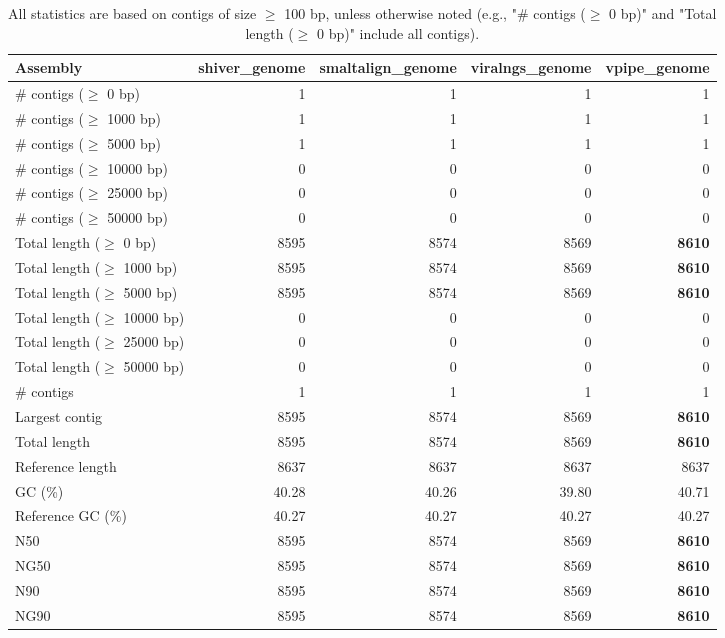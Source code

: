 \documentclass[12pt,a4paper]{article}
\begin{document}
\begin{table}[ht]
\begin{center}
\caption{All statistics are based on contigs of size $\geq$ 100 bp, unless otherwise noted (e.g., "\# contigs ($\geq$ 0 bp)" and "Total length ($\geq$ 0 bp)" include all contigs).}
\begin{tabular}{|l*{4}{|r}|}
\hline
Assembly & shiver\_genome & smaltalign\_genome & viralngs\_genome & vpipe\_genome \\ \hline
\# contigs ($\geq$ 0 bp) & 1 & 1 & 1 & 1 \\ \hline
\# contigs ($\geq$ 1000 bp) & 1 & 1 & 1 & 1 \\ \hline
\# contigs ($\geq$ 5000 bp) & 1 & 1 & 1 & 1 \\ \hline
\# contigs ($\geq$ 10000 bp) & 0 & 0 & 0 & 0 \\ \hline
\# contigs ($\geq$ 25000 bp) & 0 & 0 & 0 & 0 \\ \hline
\# contigs ($\geq$ 50000 bp) & 0 & 0 & 0 & 0 \\ \hline
Total length ($\geq$ 0 bp) & 8595 & 8574 & 8569 & {\bf 8610} \\ \hline
Total length ($\geq$ 1000 bp) & 8595 & 8574 & 8569 & {\bf 8610} \\ \hline
Total length ($\geq$ 5000 bp) & 8595 & 8574 & 8569 & {\bf 8610} \\ \hline
Total length ($\geq$ 10000 bp) & 0 & 0 & 0 & 0 \\ \hline
Total length ($\geq$ 25000 bp) & 0 & 0 & 0 & 0 \\ \hline
Total length ($\geq$ 50000 bp) & 0 & 0 & 0 & 0 \\ \hline
\# contigs & 1 & 1 & 1 & 1 \\ \hline
Largest contig & 8595 & 8574 & 8569 & {\bf 8610} \\ \hline
Total length & 8595 & 8574 & 8569 & {\bf 8610} \\ \hline
Reference length & 8637 & 8637 & 8637 & 8637 \\ \hline
GC (\%) & 40.28 & 40.26 & 39.80 & 40.71 \\ \hline
Reference GC (\%) & 40.27 & 40.27 & 40.27 & 40.27 \\ \hline
N50 & 8595 & 8574 & 8569 & {\bf 8610} \\ \hline
NG50 & 8595 & 8574 & 8569 & {\bf 8610} \\ \hline
N90 & 8595 & 8574 & 8569 & {\bf 8610} \\ \hline
NG90 & 8595 & 8574 & 8569 & {\bf 8610} \\ \hline

\end{tabular}
\end{center}
\end{table}
\end{document}
